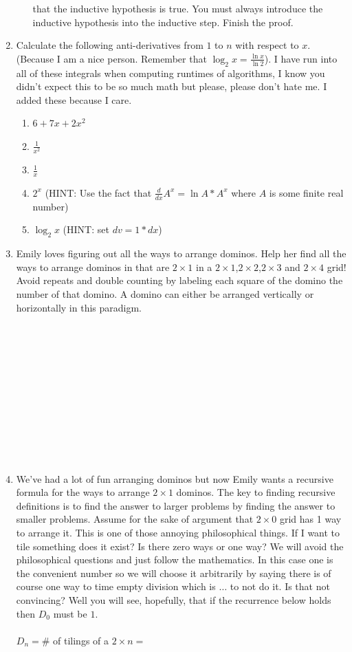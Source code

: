 \documentclass[12pt]{article}
\begin{document}
\begin{enumerate}
\begin{enumerate}
that the inductive hypothesis is true. You must always introduce the inductive hypothesis into 
the inductive step. Finish the proof.
\end{enumerate}
\newpage
\item Calculate the following anti-derivatives from $1$ to $n$ with respect to $x$. 
(Because I am a nice person. Remember that $\log_2{x}=\frac{\ln{x}}{\ln{2}}$). 
I have run into all of these integrals when computing runtimes of algorithms, 
I know you didn't expect this to be so much math but please, please don't hate me. 
I added these because I care.
\begin{enumerate}
\item $6+7x+2x^2$
\item $\frac{1}{x^2}$
\item $\frac{1}{x}$
\item $2^x$ (HINT: Use the fact that $\frac{d}{dx}A^x = \ln{A}*A^x$ where $A$ is some finite real number)
\item $\log_{2}{x}$  (HINT: set $dv=1*dx$)
\end{enumerate}
\newpage
\item Emily loves figuring out all the ways to arrange dominos. Help her find all the ways to arrange dominos in that are 
$2 \times 1$ in a $2 \times 1$,$2 \times 2$,$2 \times 3$ and $2 \times 4$ grid! Avoid repeats and 
double counting by labeling each square of the domino the number of that domino. A domino can either be 
arranged vertically or horizontally in this paradigm.\\\\\\\\\\\\\\\\\\\\\\\\
\item We've had a lot of fun arranging dominos but now Emily wants a recursive formula for the ways to arrange 
$2 \times 1$ dominos. The key to finding recursive definitions is to find the answer to larger problems by finding 
the answer to smaller problems. Assume for the sake of argument that $2 \times 0$ grid has 1 way to arrange it. This 
is one of those annoying philosophical things. If I want to tile something does it exist? Is there 
zero ways or one way? We will avoid the philosophical questions and just follow the mathematics. In this case 
one is the convenient number so we will choose it arbitrarily by saying there is of course 
one way to time empty division which is $\dots$ to not do it. Is that not convincing? Well you will see, 
hopefully, that if the recurrence below holds then $D_0$ must be $1$.\\\\
$D_n = $\# of tilings of a $2 \times n =$
\newpage
\end{enumerate}
\end{document}
